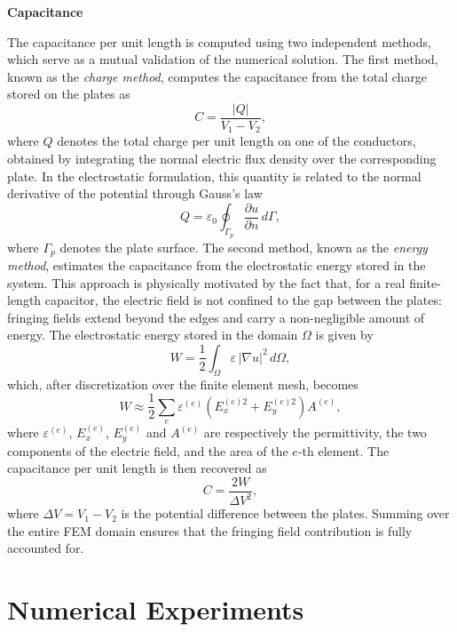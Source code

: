 \documentclass[11pt,onecolumn]{article}
\begin{document}
\textbf{Capacitance}
\label{sec:capacitance}

The capacitance per unit length is computed using two independent methods, 
which serve as a mutual validation of the numerical solution.
The first method, known as the \textit{charge method}, computes the capacitance 
from the total charge stored on the plates as
\begin{equation}
    C = \frac{|Q|}{V_1 - V_2},
\end{equation}
where $Q$ denotes the total charge per unit length on one of the conductors, obtained 
by integrating the normal electric flux density over the corresponding plate. In the 
electrostatic formulation, this quantity is related to the normal derivative of the 
potential through Gauss's law
\begin{equation}
    Q = \varepsilon_0 \oint_{\Gamma_p} \frac{\partial u}{\partial n} \, d\Gamma,
\end{equation}
where $\Gamma_p$ denotes the plate surface.
The second method, known as the \textit{energy method}, estimates the capacitance 
from the electrostatic energy stored in the system. This approach is physically motivated 
by the fact that, for a real finite-length capacitor, the electric field is not confined 
to the gap between the plates: fringing fields extend beyond the edges and carry a 
non-negligible amount of energy. The electrostatic energy stored in the domain $\Omega$ 
is given by
\begin{equation}
    W = \frac{1}{2} \int_{\Omega} \varepsilon \, |\nabla u|^2 \, d\Omega,
\end{equation}
which, after discretization over the finite element mesh, becomes
\begin{equation}
    W \approx \frac{1}{2} \sum_{e} \varepsilon^{(e)} \left( E_x^{(e)2} + E_y^{(e)2} 
    \right) A^{(e)},
\end{equation}
where $\varepsilon^{(e)}$, $E_x^{(e)}$, $E_y^{(e)}$ and $A^{(e)}$ are respectively 
the permittivity, the two components of the electric field, and the area of the $e$-th 
element. The capacitance per unit length is then recovered as
\begin{equation}
    C = \frac{2W}{\Delta V^2},
\end{equation}
where $\Delta V = V_1 - V_2$ is the potential difference between the plates. Summing 
over the entire FEM domain ensures that the fringing field contribution is fully 
accounted for.
\section{Numerical Experiments}
\end{document}
